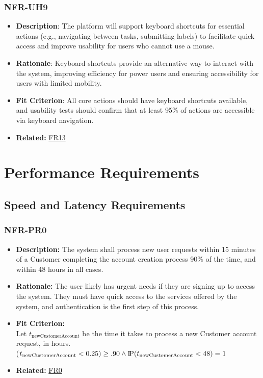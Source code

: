\documentclass[12pt]{article}
\newcommand{\probP}{\text{I\kern-0.15em P}}
\begin{document}
        \subsubsection*{NFR-UH9} 
        \label{sec:UH9}
        \begin{itemize} 
            \item \textbf{Description}: The platform will support keyboard shortcuts for essential actions (e.g., navigating between tasks, submitting labels) to facilitate quick access and improve usability for users who cannot use a mouse.  
            \item \textbf{Rationale}: Keyboard shortcuts provide an alternative way to interact with the system, improving efficiency for power users and ensuring accessibility for users with limited mobility.  
            \item \textbf{Fit Criterion}: All core actions should have keyboard shortcuts available, and usability tests should confirm that at least 95\% of actions are accessible via keyboard navigation.
            \item \textbf{Related:} \hyperref[sec:FR13]{FR13}
        \end{itemize}



\section{Performance Requirements}
\subsection{Speed and Latency Requirements}
\subsubsection*{NFR-PR0}
\label{sec:PR0}
\begin{itemize}
  \item \textbf{Description:} The system shall process new user requests within 15 minutes of a Customer completing the account creation process 90\% of the time, and within 48 hours in all cases. 
  \item \textbf{Rationale:} The user likely has urgent needs if they are signing up to access the system. They must have quick access to the services offered by the system, and authentication is the first step of this process.
  \item \textbf{Fit Criterion:}\\ Let $t_{\text{newCustomerAccount}}$ be the time it takes to process a new Customer account request, in hours.\\ \probP($t_{\text{newCustomerAccount}} < 0.25) \geq .90 \wedge \probP(t_{\text{newCustomerAccount}} < 48) = 1 $
  \item \textbf{Related:} \hyperref[sec:FR0]{FR0}
\end{itemize}
\end{document}

